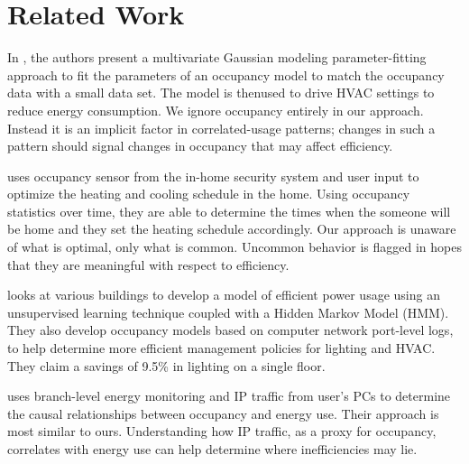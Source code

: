 \section{Related Work}

In \cite{occmodels_buildsys11}, the authors present a multivariate Gaussian modeling parameter-fitting 
approach to fit the parameters of an occupancy model to match the occupancy data with a small data set.  
The model is thenused to drive HVAC settings to reduce energy consumption.  We ignore occupancy entirely 
in our approach.  Instead it is an implicit factor in correlated-usage patterns; changes in such a pattern 
should signal changes in occupancy that may affect efficiency.

\cite{kaminthermo} uses occupancy sensor from the in-home security system and user input to
optimize the heating and cooling schedule in the home.  Using occupancy statistics over time, they
are able to determine the times when the someone will be home and they set the heating schedule accordingly.
Our approach is unaware of what is optimal, only what is common.  Uncommon behavior is flagged in hopes
that they are meaningful with respect to efficiency.

\cite{Bellala_buildsys11} looks at various buildings to develop a model of efficient power usage using 
an unsupervised learning technique coupled with a Hidden Markov Model (HMM).  They also develop occupancy models based on
computer network port-level logs, to help determine more efficient management policies for lighting and HVAC.  
They claim a savings of 9.5\% in lighting on a single floor.

\cite{kim:buildsys2010} uses branch-level energy monitoring and IP traffic from user's PCs to determine the
causal relationships between occupancy and energy use.  Their approach is most similar to ours.  Understanding how IP 
traffic, as a proxy for occupancy, correlates with energy use can help determine where inefficiencies may lie.



